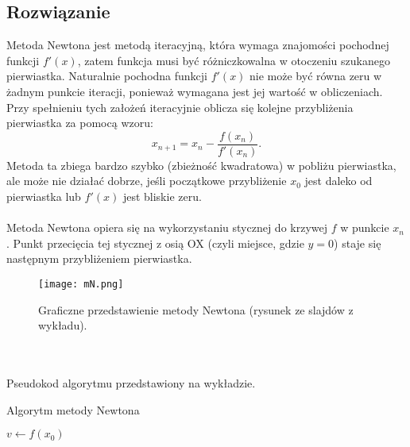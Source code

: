 \documentclass{article}
\begin{document}
\subsection{Rozwiązanie}
Metoda Newtona jest metodą iteracyjną, która wymaga znajomości pochodnej funkcji $f′(x)$, zatem funkcja musi być różniczkowalna w otoczeniu szukanego pierwiastka. Naturalnie pochodna funkcji $f′(x)$  nie może być równa zeru w żadnym punkcie iteracji, ponieważ wymagana jest jej wartość w obliczeniach. Przy spełnieniu tych założeń iteracyjnie oblicza się kolejne przybliżenia pierwiastka za pomocą wzoru:
\[x_{n+1} = x_n - \frac{f(x_n)}{f'(x_n)}.\]
Metoda ta zbiega bardzo szybko (zbieżność kwadratowa) w pobliżu pierwiastka, ale może nie działać dobrze, jeśli początkowe przybliżenie $x_0$ jest daleko od pierwiastka lub $f′(x)$ jest bliskie zeru.
\\ \\ 
Metoda Newtona opiera się na wykorzystaniu stycznej do krzywej $f$ w punkcie $x_n$. Punkt przecięcia tej stycznej z osią OX (czyli miejsce, gdzie $y = 0$) staje się następnym przybliżeniem pierwiastka. 
\begin{figure}[H]
    \centering
    \begin{minipage}{0.6\textwidth}
    \texttt{[image: mN.png]}
    \caption{Graficzne przedstawienie metody Newtona (rysunek ze slajdów z wykładu).}
    \end{minipage}
\end{figure}
\\ \\
Pseudokod algorytmu przedstawiony na wykładzie. \\
\begin{algorithm}[H]
\caption{Algorytm metody Newtona}
    $v \gets f(x_0)$\;
    \;
\end{algorithm}
\end{document}
